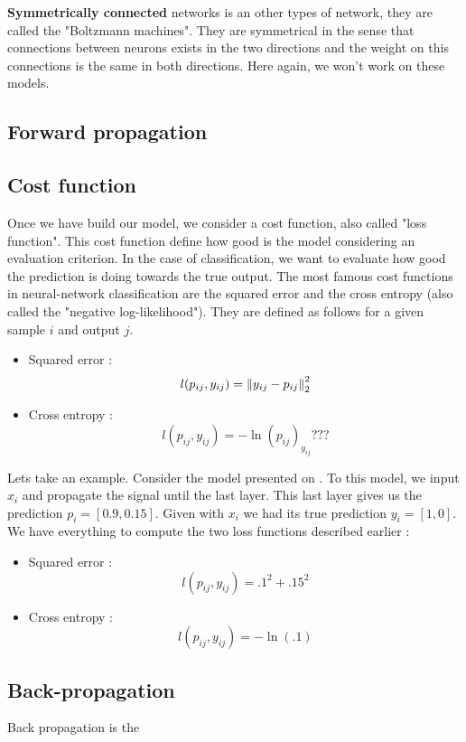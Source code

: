 		\textbf{Symmetrically connected} networks is an other types of network, they are called the "Boltzmann machines". They are symmetrical in the sense that connections between neurons exists in the two directions and the weight on this connections is the same in both directions. Here again, we won't work on these models.


	\subsection{Forward propagation}
		

	

	\subsection{Cost function}
		Once we have build our model, we consider a cost function, also called "loss function". This cost function define how good is the model considering an evaluation criterion. In the case of classification, we want to evaluate how good the prediction is doing towards the true output.
		The most famous cost functions in neural-network classification are the squared error and the cross entropy (also called the "negative log-likelihood"). They are defined as follows for a given sample $i$ and output $j$.
		\begin{itemize}
			\item Squared error : $$ l(p_{ij},y_{ij}) = \left\lVert y_{ij} - p_{ij}\right\rVert_2^2 $$
			\item Cross entropy : $$ l(p_{ij},y_{ij}) = -\ln(p_{ij})_{y_{ij}}  ??? $$ 
		\end{itemize}

		Lets take an example. Consider the model presented on . To this model, we input $x_i$ and propagate the signal until the last layer. This last layer gives us the prediction $p_i = [0.9,0.15]$. Given with $x_i$ we had its true prediction $y_i = [1,0]$. We have everything to compute the two loss functions described earlier : 
		\begin{itemize}
			\item Squared error : $$ l(p_{ij},y_{ij}) =  .1^2 + .15^2 $$
			\item Cross entropy : $$ l(p_{ij},y_{ij}) = -\ln(.1)  $$
		\end{itemize}


	\subsection{Back-propagation}
		Back propagation is the 


